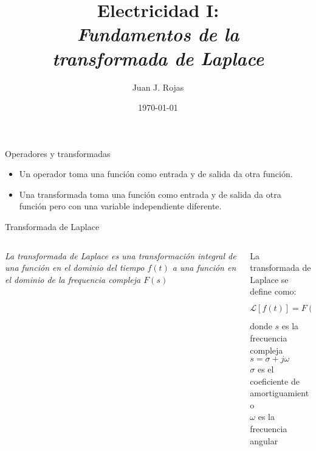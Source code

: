 \documentclass[aspectratio=169]{beamer}
\title{Electricidad I: \\ \emph{Fundamentos de la}\\ \emph{transformada de Laplace}}
\author{
    Juan J. Rojas
}
\institute{Instituto Tecnológico de Costa Rica}
\date{\today}
\begin{document}

\maketitle

\begin{frame}{Operadores y transformadas}
        \begin{itemize}
            \item<1-> Un operador toma una función como entrada y de salida da otra función.
            \item<2> Una transformada toma una función como entrada y de salida da otra función pero con una variable independiente diferente.
        \end{itemize}
\end{frame}

\begin{frame}{Transformada de Laplace}
    \begin{columns}[onlytextwidth]
        \begin{column}{0.5\textwidth}
            \emph{La transformada de Laplace es una transformación integral de una función en el dominio del tiempo $f(t)$ a una función en el dominio de la frequencia compleja $F(s)$}
        \end{column}
        \begin{column}{0.5\textwidth}
            La transformada de Laplace se define como:
            \begin{equation*}
                \mathcal{L}[f(t)] = F(s) = \int_{0^{-}}^\infty f(t)e^{-st}\,dt
            \end{equation*}
            donde $s$ es la frecuencia compleja $s = \sigma + j\omega$\\[8pt]
            $\sigma$ es el coeficiente de amortiguamiento\\[8pt]
            $\omega$ es la frecuencia angular\\[8pt]
        \end{column}
    \end{columns}
\end{frame}
\end{document}
